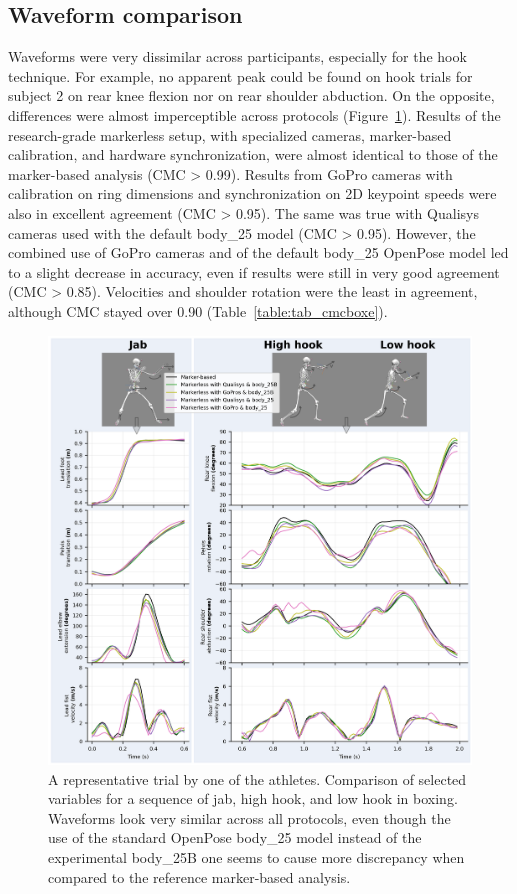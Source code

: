 \subsection{Waveform comparison}

Waveforms were very dissimilar across participants, especially for the hook technique. For example, no apparent peak could be found on hook trials for subject 2 on rear knee flexion nor on rear shoulder abduction. On the opposite, differences were almost imperceptible across protocols (Figure~\ref{fig_graphkpi}). Results of the research-grade markerless setup, with specialized cameras, marker-based calibration, and hardware synchronization, were almost identical to those of the marker-based analysis (CMC > 0.99). Results from GoPro cameras with calibration on ring dimensions and synchronization on 2D keypoint speeds were also in excellent agreement (CMC > 0.95). The same was true with Qualisys cameras used with the default body\_25 model (CMC > 0.95). However, the combined use of GoPro cameras and of the default body\_25 OpenPose model led to a slight decrease in accuracy, even if results were still in very good agreement (CMC > 0.85). Velocities and shoulder rotation were the least in agreement, although CMC stayed over 0.90 (Table~\ref{table:tab_cmcboxe}).

\begin{figure}[!ht]
	\centering
	\def\svgwidth{1\columnwidth}
	\fontsize{10pt}{10pt}\selectfont
	\includegraphics[width=1\linewidth]{"../Chap6/Figures/Fig_GraphKPI.png"}
	\caption{A representative trial by one of the athletes. Comparison of selected variables for a sequence of jab, high hook, and low hook in boxing. Waveforms look very similar across all protocols, even though the use of the standard OpenPose body\_25 model instead of the experimental body\_25B one seems to cause more discrepancy when compared to the reference marker-based analysis.}
	\label{fig_graphkpi}
\end{figure}

